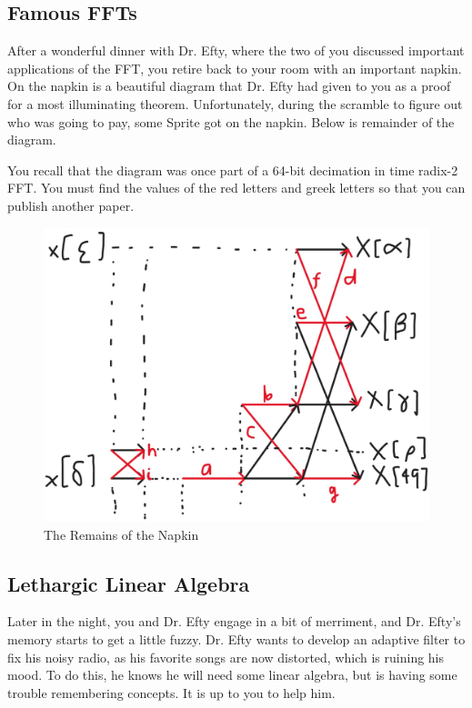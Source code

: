 \documentclass{article}
\begin{document}
\subsection{Famous FFTs}

After a wonderful dinner with Dr. Efty, where the two of you discussed important applications of the FFT, you retire back to your room with an important napkin. On the napkin is a beautiful diagram that Dr. Efty had given to you as a proof for a most illuminating theorem. Unfortunately, during the scramble to figure out who was going to pay, some Sprite got on the napkin. Below is remainder of the diagram.

You recall that the diagram was once part of a 64-bit decimation in time radix-2 FFT. You must find the values of the red letters and greek letters so that you can publish another paper.

\begin{figure}[h]
\begin{center}
    \includegraphics[width=0.8 \textwidth]{figures/FFT Diagram.jpg}
    \caption{The Remains of the Napkin}
    \label{fig:FFT_diagram}
\end{center}
\end{figure}

\newpage

\subsection{Lethargic Linear Algebra}

Later in the night, you and Dr. Efty engage in a bit of merriment, and Dr. Efty's memory starts to get a little fuzzy. Dr. Efty wants to develop an adaptive filter to fix his noisy radio, as his favorite songs are now distorted, which is ruining his mood. To do this, he knows he will need some linear algebra, but is having some trouble remembering concepts. It is up to you to help him.
\end{document}
